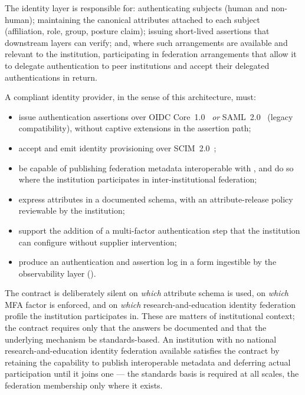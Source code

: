 The identity layer is responsible for: authenticating subjects
(human and non-human); maintaining the canonical attributes attached
to each subject (affiliation, role, group, posture claim); issuing
short-lived assertions that downstream layers can verify; and,
where such arrangements are available and relevant to the
institution, participating in federation arrangements that allow it
to delegate authentication to peer institutions and accept their
delegated authentications in return.

\begin{contractbox}
\noindent A compliant identity provider, in the sense of this
architecture, must:

\begin{itemize}[leftmargin=1.5em,nosep]
  \item issue authentication assertions over OIDC
    Core~1.0~\cite{oidc-core-1.0} \emph{or} SAML~2.0~\cite{saml-core-2.0}
    (legacy compatibility), without captive extensions in the
    assertion path;
  \item accept and emit identity provisioning over
    SCIM~2.0~\cite{rfc-7643-scim-core,rfc-7644-scim-protocol};
  \item be capable of publishing federation metadata interoperable
    with , and do so
    where the institution participates in inter-institutional
    federation;
  \item express attributes in a documented schema, with an
    attribute-release policy reviewable by the institution;
  \item support the addition of a multi-factor authentication step
    that the institution can configure without supplier intervention;
  \item produce an authentication and assertion log in a form
    ingestible by the observability layer
    ().
\end{itemize}
\end{contractbox}

The contract is deliberately silent on \emph{which} attribute schema
is used, on \emph{which} MFA factor is enforced, and on \emph{which}
research-and-education identity federation profile the
institution participates in. These are matters of institutional
context; the contract requires only that the answers be documented
and that the underlying mechanism be standards-based. An institution
with no national research-and-education identity federation available
satisfies the contract by
retaining the capability to publish interoperable metadata and
deferring actual participation until it joins one --- the standards
basis is required at all scales, the federation membership only
where it exists.

